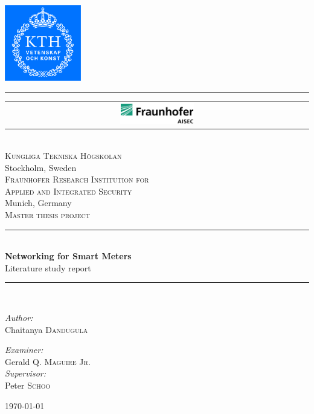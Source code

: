 \begin{titlepage}
\newcommand{\HRule}{\rule{\linewidth}{0.5mm}}
\begin{center}

\includegraphics[width=0.25\textwidth]{logo/kth_cmyk.pdf}
\rule[-0.86cm]{0.05cm}{3.9cm}
\begin{tabular}{ c }
\includegraphics[width=0.25\textwidth]{logo/aisec.pdf} \\[-1.2cm]
\end{tabular}
\\[1cm]
\textsc{\LARGE Kungliga Tekniska H\"ogskolan}\\
{\large Stockholm, Sweden}\\[1.5cm]
\textsc{\LARGE Fraunhofer Research Institution for}\\ [0.25cm]
\textsc{\LARGE Applied and Integrated Security}\\
{\large Munich, Germany}\\[1.5cm]
\textsc{\Large Master thesis project}\\[0.5cm]


\HRule \\[0.4cm]
{ \huge \bfseries Networking for Smart Meters}\\[0.4cm]
{\large Literature study report}
\HRule \\[1.5cm]

\begin{minipage}{0.4\textwidth}
\begin{flushleft} \large
\emph{Author:}\\
Chaitanya \textsc{Dandugula}
\end{flushleft}
\end{minipage}
\begin{minipage}{0.4\textwidth}
\begin{flushright} \large
\emph{Examiner:} \\
Gerald \textsc{Q. Maguire Jr.}\\
\emph{Supervisor:} \\
Peter \textsc{Schoo}
\end{flushright}
\end{minipage}

\vfill

{\large \today}

\end{center}

\end{titlepage}